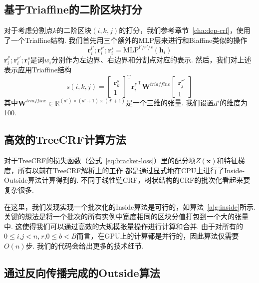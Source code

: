 \subsection{基于Triaffine的二阶区块打分}
对于考虑分割点$k$的二阶区块$(i,k,j)$的打分，我们参考章节~\ref{cha:dep-crf}，使用了一个Triaffine结构.
我们首先用三个额外的MLP层来进行和Biaffine类似的操作
\begin{equation}
	\label{con-mlp-sib}
	\mathbf{r}_i^{l'}; \mathbf{r}_i^{r'}; \mathbf{r}_i^{s} =\mathrm{MLP}^{l'/r'/s} \left( \mathbf{h}_i \right)
\end{equation}
$\mathbf{r}_i^{l'}; \mathbf{r}_i^{r'}; \mathbf{r}_i^{s}$是词$w_i$分别作为左边界、右边界和分割点对应的表示.
然后，我们对上述表示应用Triaffine结构
\begin{equation} \label{eq:con-triaffine}
	\mathrm{s}(i,k,j) =
	\left[
		\begin{array}{c}
			\mathbf{r}_{k}^{s} \\
			1
		\end{array}
		\right]^\mathrm{T}
	{\mathbf{r}_{i}^{l'}}^\mathrm{T}
	\mathbf{W}^\textit{triaffine}
	\left[
		\begin{array}{c}
			\mathbf{r}_{j}^{r'} \\
			1
		\end{array}
		\right]
\end{equation}
其中$\mathbf{W}^\textit{triaffine} \in \mathbb{R}^{(d') \times (d'+1) \times (d'+1)}$是一个三维的张量.
我们设置$d'$的维度为100.



\subsection{高效的TreeCRF计算方法}

对于TreeCRF的损失函数（公式~\ref{eq:bracket-loss}）里的配分项$Z(\boldsymbol{x})$和特征梯度，所有以前在TreeCRF解析上的工作 \citep{finkel-etal-2008-efficient,durrett-klein-2015-neural}都是通过显式地在CPU上进行了Inside-Outside算法计算得到的.
不同于线性链CRF，树状结构的CRF的批次化看起来要复杂很多.

在这里，我们发现实现一个批次化的Inside算法是可行的，如算法~\ref{alg:inside}所示.
关键的想法是将一个批次的所有实例中宽度相同的区块分值打包到一个大的张量中.
这使得我们可以通过高效的大规模张量操作进行计算和合并.
由于对所有的$0 \le i$,$j<n$,$~r$,$0\le b<B$而言，在GPU上的计算都是并行的，因此算法仅需要$O(n)$步.
我们的代码会给出更多的技术细节.

\subsection{通过反向传播完成的Outside算法}

